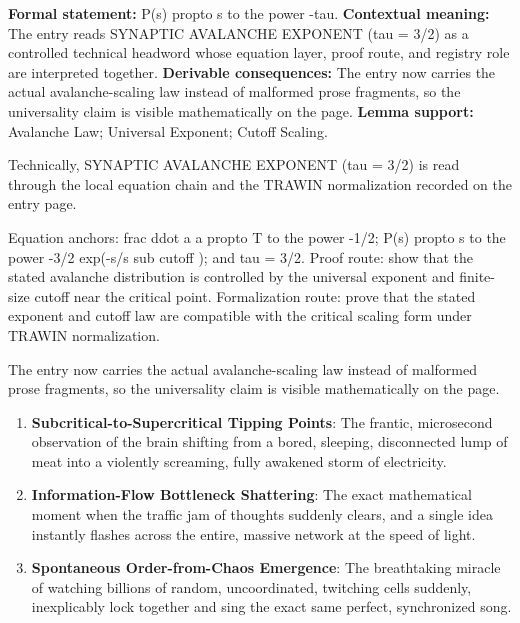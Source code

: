 \begingroup\footnotesize\setlength{\emergencystretch}{3em}\sloppy
\textbf{Formal statement:} P(s) propto s to the power -tau. \textbf{Contextual meaning:} The entry reads SYNAPTIC AVALANCHE EXPONENT (tau = 3/2) as a controlled technical headword whose equation layer, proof route, and registry role are interpreted together. \textbf{Derivable consequences:} The entry now carries the actual avalanche-scaling law instead of malformed prose fragments, so the universality claim is visible mathematically on the page. \textbf{Lemma support:} Avalanche Law; Universal Exponent; Cutoff Scaling.\par
\endgroup

Technically, SYNAPTIC AVALANCHE EXPONENT (tau = 3/2) is read through the local equation chain and the TRAWIN normalization recorded on the entry page.

Equation anchors: frac ddot a a propto T to the power -1/2; P(s) propto s to the power -3/2 exp(-s/s sub cutoff ); and tau = 3/2. Proof route: show that the stated avalanche distribution is controlled by the universal exponent and finite-size cutoff near the critical point. Formalization route: prove that the stated exponent and cutoff law are compatible with the critical scaling form under TRAWIN normalization.

The entry now carries the actual avalanche-scaling law instead of malformed prose fragments, so the universality claim is visible mathematically on the page.
\endgroup

\begin{enumerate}[leftmargin=1.6em,itemsep=6pt,topsep=4pt]
\item \textbf{Subcritical-to-Supercritical Tipping Points}: The frantic, microsecond observation of the brain shifting from a bored, sleeping, disconnected lump of meat into a violently screaming, fully awakened storm of electricity.
\item \textbf{Information-Flow Bottleneck Shattering}: The exact mathematical moment when the traffic jam of thoughts suddenly clears, and a single idea instantly flashes across the entire, massive network at the speed of light.
\item \textbf{Spontaneous Order-from-Chaos Emergence}: The breathtaking miracle of watching billions of random, uncoordinated, twitching cells suddenly, inexplicably lock together and sing the exact same perfect, synchronized song.
\end{enumerate}

